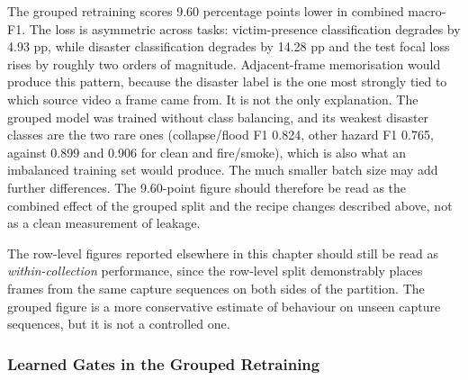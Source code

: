 \documentclass[journal]{IEEEtran}
\begin{document}
The grouped retraining scores 9.60 percentage points lower in combined macro-F1. The loss is asymmetric across tasks: victim-presence classification degrades by 4.93 pp, while disaster classification degrades by 14.28 pp and the test focal loss rises by roughly two orders of magnitude. Adjacent-frame memorisation would produce this pattern, because the disaster label is the one most strongly tied to which source video a frame came from. It is not the only explanation. The grouped model was trained without class balancing, and its weakest disaster classes are the two rare ones (collapse/flood F1 0.824, other hazard F1 0.765, against 0.899 and 0.906 for clean and fire/smoke), which is also what an imbalanced training set would produce. The much smaller batch size may add further differences. The 9.60-point figure should therefore be read as the combined effect of the grouped split and the recipe changes described above, not as a clean measurement of leakage.

The row-level figures reported elsewhere in this chapter should still be read as \emph{within-collection} performance, since the row-level split demonstrably places frames from the same capture sequences on both sides of the partition. The grouped figure is a more conservative estimate of behaviour on unseen capture sequences, but it is not a controlled one.

\subsubsection{Learned Gates in the Grouped Retraining}
\label{sec:grouped_gates}
\end{document}
